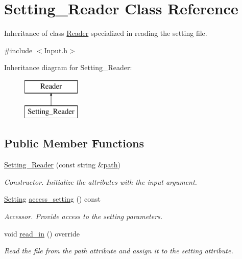 \hypertarget{class_setting___reader}{}\section{Setting\+\_\+\+Reader Class Reference}
\label{class_setting___reader}


Inheritance of class \mbox{\hyperlink{class_reader}{Reader}} specialized in reading the setting file.  




{\ttfamily \#include $<$Input.\+h$>$}

Inheritance diagram for Setting\+\_\+\+Reader\+:\begin{figure}[H]
\begin{center}
\leavevmode
\includegraphics[height=2.000000cm]{class_setting___reader}
\end{center}
\end{figure}
\subsection*{Public Member Functions}
\begin{DoxyCompactItemize}
\item 
\mbox{\label{class_setting___reader_a604a6eaadd0d39eb3d6b4ae768b95364}} 
\mbox{\hyperlink{class_setting___reader_a604a6eaadd0d39eb3d6b4ae768b95364}{Setting\+\_\+\+Reader}} (const string \&\mbox{\hyperlink{class_reader_a4f3eaccb117f248d4649ffb4e793a23d}{path}})
\begin{DoxyCompactList}\small\item\em Constructor. Initialize the attributes with the input argument. \end{DoxyCompactList}\item 
\mbox{\label{class_setting___reader_a473c6649c848b28d53ebe99acb6f1c0f}} 
\mbox{\hyperlink{struct_setting}{Setting}} \mbox{\hyperlink{class_setting___reader_a473c6649c848b28d53ebe99acb6f1c0f}{access\+\_\+setting}} () const
\begin{DoxyCompactList}\small\item\em Accessor. Provide access to the setting parameters. \end{DoxyCompactList}\item 
\mbox{\label{class_setting___reader_a32f8f22c9ef67f4ab3f61f9cb5da69b3}} 
void \mbox{\hyperlink{class_setting___reader_a32f8f22c9ef67f4ab3f61f9cb5da69b3}{read\+\_\+in}} () override
\begin{DoxyCompactList}\small\item\em Read the file from the path attribute and assign it to the setting attribute. \end{DoxyCompactList}\end{DoxyCompactItemize}
